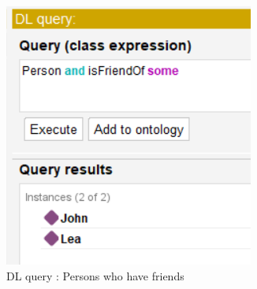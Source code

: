 \begin{figure}[H]
    \centering
    \begin{minipage}[b]{0.25\textwidth}
        \centering
        \includegraphics[width=\textwidth]{images/1.1 - tuto/DL query.png}
        \caption{DL query : Persons who have friends}
        \label{fig:image1}
    \end{minipage}
    \hfill
    \begin{minipage}[b]{0.25\textwidth}
        \centering

\end{minipage}
\end{figure}
